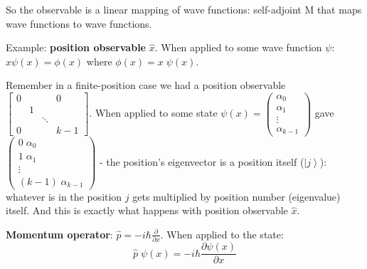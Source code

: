 \documentclass{scrartcl}
\newcommand{\ket}[1]{\left| #1 \right>} %
\begin{document}
So the observable is a linear mapping of wave functions: self-adjoint M that
maps wave functions to wave functions.

Example: {\bf position observable} $\hat{x}$. When applied to some wave function
$\psi$: $\hat x \psi(x) = \phi(x)$ where $\phi(x) = x \; \psi(x)$.

Remember in a finite-position case we had a position observable
$\left[ \begin{array}{cccc} 0 & & & 0 \\ & 1 & & \\ & & \ddots & \\ 0 & & &k-
    1 \end{array}\right]$. When applied to some state $\psi(x) = \begin{pmatrix}
  \alpha_0 \\ \alpha_1 \\ \vdots \\ \alpha_{k-1} \end{pmatrix}$ gave $
\begin{pmatrix} 0 \; \alpha_0 \\ 1 \; \alpha_1 \\ \vdots \\ (k-1) \;
  \alpha_{k-1} \end{pmatrix} $ - the position's eigenvector is a position itself
($\ket j$): whatever is in the position $j$ gets multiplied by position number
(eigenvalue) itself. And this is exactly what happens with position observable
$\hat x$.


{\bf Momentum operator}: $\hat p = -i\hbar \frac \partial {\partial x}$. When
applied to the state:
$$ \hat p \; \psi(x) = - i \hbar \frac{\partial \psi(x)}{\partial x}$$
\end{document}
